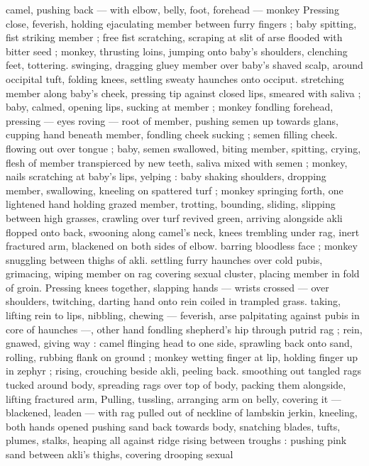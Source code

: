 {camel, pushing back --- with elbow, belly, foot, forehead --- monkey 
Pressing close, feverish, holding ejaculating member between furry 
fingers ; baby spitting, fist striking member ; free fist scratching, 
scraping at slit of arse flooded with bitter seed ; monkey, thrusting 
loins, jumping onto baby's shoulders, clenching feet, tottering. 
swinging, dragging gluey member over baby's shaved scalp, around 
occipital tuft, folding knees, settling sweaty haunches onto occiput. 
stretching member along baby's cheek, pressing tip against closed 
lips, smeared with saliva ; baby, calmed, opening lips, sucking at 
member ; monkey fondling forehead, pressing --- eyes roving --- 
root of member, pushing semen up towards glans, cupping hand 
beneath member, fondling cheek sucking ; semen filling cheek. 
flowing out over tongue ; baby, semen swallowed, biting member, 
spitting, crying, flesh of member transpierced by new teeth, saliva 
mixed with semen ; monkey, nails scratching at baby's lips, yelping : 
baby shaking shoulders, dropping member, swallowing, kneeling on 
spattered turf ; monkey springing forth, one lightened hand holding 
grazed member, trotting, bounding, sliding, slipping between high 
grasses, crawling over turf revived green, arriving alongside akli 
flopped onto back, swooning along camel's neck, knees trembling 
under rag, inert fractured arm, blackened on both sides of elbow. 
barring bloodless face ; monkey snuggling between thighs of akli. 
settling furry haunches over cold pubis, grimacing, wiping member 
on rag covering sexual cluster, placing member in fold of groin. 
Pressing knees together, slapping hands --- wrists crossed --- over 
shoulders, twitching, darting hand onto rein coiled in trampled grass. 
taking, lifting rein to lips, nibbling, chewing --- feverish, arse 
palpitating against pubis in core of haunches ---, other hand 
fondling shepherd's hip through putrid rag ; rein, gnawed, giving way 
: camel flinging head to one side, sprawling back onto sand, rolling, 
rubbing flank on ground ; monkey wetting finger at lip, holding finger 
up in zephyr ; rising, crouching beside akli, peeling back. smoothing 
out tangled rags tucked around body, spreading rags over top of 
body, packing them alongside, lifting fractured arm, Pulling, tussling, 
arranging arm on belly, covering it --- blackened, leaden --- with rag 
pulled out of neckline of lambskin jerkin, kneeling, both hands 
opened pushing sand back towards body, snatching blades, tufts, 
plumes, stalks, heaping all against ridge rising between troughs : 
pushing pink sand between akli's thighs, covering drooping sexual 
}

